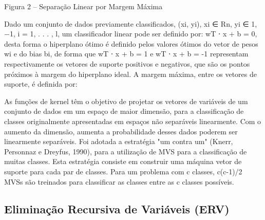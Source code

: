Figura 2 – Separação Linear por Margem Máxima

Dado um conjunto de dados previamente classificados, (xi, yi), xi ∈ Rn, yi ∈ {1, −1}, i = 1, . . . , l, um classificador linear pode ser definido por: wT ⋅ x + b = 0, desta forma o hiperplano ótimo é definido pelos valores ótimos do vetor de pesos wi e do bias bi, de forma que wT ⋅ x + b = 1 e wT ⋅ x + b = -1 representam respectivamente os vetores de suporte positivos e negativos, que são os pontos próximos à margem do hiperplano ideal. A margem máxima, entre os vetores de suporte, é definida por:

As funções de kernel têm o objetivo de projetar os vetores de variáveis de um conjunto de dados em um espaço de maior dimensão, para a classificação de classes originalmente apresentadas em espaços não separáveis linearmente. Com o aumento da dimensão, aumenta a probabilidade desses dados poderem ser linearmente separáveis. 
Foi adotada a estratégia "um contra um" (Knerr, Personnaz e Dreyfus, 1990), para a utilização de MVS para a classificação de muitas classes. Esta estratégia consiste em construir uma máquina vetor de suporte para cada par de classes. Para um problema com c classes, c(c-1)/2 MVSs são treinados para classificar as classes entre as c classes possíveis.

\subsection{Eliminação Recursiva de Variáveis (ERV)}

